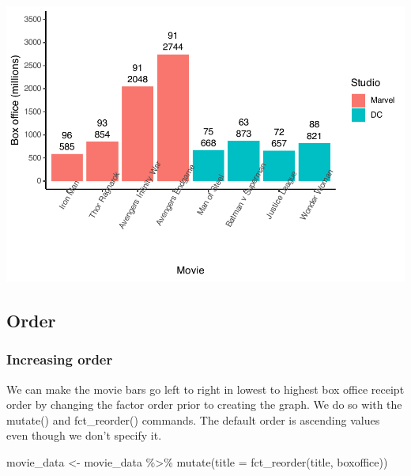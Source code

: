 \documentclass[
]{krantz}
\makeatletter
\newenvironment{Shaded}{\begin{snugshade}}{\end{snugshade}}
\newcommand{\AttributeTok}[1]{\textcolor[rgb]{0.61,0.61,0.61}{#1}}
\newcommand{\FunctionTok}[1]{\textcolor[rgb]{0,0,0}{#1}}
\newcommand{\NormalTok}[1]{#1}
\newcommand{\OtherTok}[1]{\textcolor[rgb]{0.37,0.37,0.37}{#1}}
\newcommand{\SpecialCharTok}[1]{\textcolor[rgb]{0,0,0}{#1}}
\newenvironment{kframe}{%
\medskip{}
\setlength{\fboxsep}{.8em}
 \def\at@end@of@kframe{}%
 \ifinner\ifhmode%
  \def\at@end@of@kframe{\end{minipage}}%
  \begin{minipage}{\columnwidth}%
 \fi\fi%
 \def\FrameCommand##1{\hskip\@totalleftmargin \hskip-\fboxsep
 \colorbox{shadecolor}{##1}\hskip-\fboxsep
     \hskip-\linewidth \hskip-\@totalleftmargin \hskip\columnwidth}%
 \MakeFramed {\advance\hsize-\width
   \@totalleftmargin\z@ \linewidth\hsize
   \@setminipage}}%
 {\par\unskip\endMakeFramed%
 \at@end@of@kframe}
\renewenvironment{Shaded}{\begin{kframe}}{\end{kframe}}
\makeatother
\begin{document}
\includegraphics[width=0.65\linewidth]{bookdown_files/figure-latex/unnamed-chunk-126-1}

\hypertarget{order}{%
\subsection{Order}\label{order}}

\hypertarget{increasing-order}{%
\subsubsection{Increasing order}\label{increasing-order}}

We can make the movie bars go left to right in lowest to highest box office receipt order by changing the factor order prior to creating the graph. We do so with the mutate() and fct\_reorder() commands. The default order is ascending values even though we don't specify it.

\begin{Shaded}
\begin{Highlighting}[]
\NormalTok{movie\_data }\OtherTok{\textless{}{-}}\NormalTok{ movie\_data }\SpecialCharTok{\%\textgreater{}\%} 
  \FunctionTok{mutate}\NormalTok{(}\AttributeTok{title =} \FunctionTok{fct\_reorder}\NormalTok{(title,}
\NormalTok{                             boxoffice))}
\end{Highlighting}
\end{Shaded}
\end{document}

